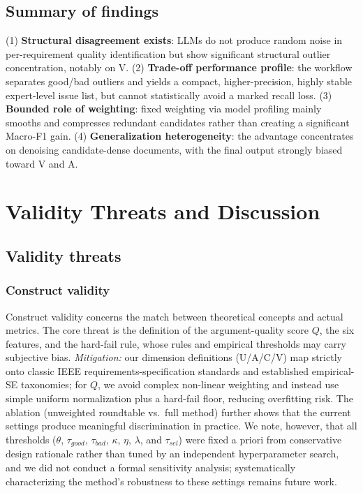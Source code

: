 \documentclass[sn-mathphys-num]{sn-jnl}
\begin{document}
\subsection{Summary of findings}
(1) \textbf{Structural disagreement exists}: LLMs do not produce random noise in per-requirement quality identification but show significant structural outlier concentration, notably on V. (2) \textbf{Trade-off performance profile}: the workflow separates good/bad outliers and yields a compact, higher-precision, highly stable expert-level issue list, but cannot statistically avoid a marked recall loss. (3) \textbf{Bounded role of weighting}: fixed weighting via model profiling mainly smooths and compresses redundant candidates rather than creating a significant Macro-F1 gain. (4) \textbf{Generalization heterogeneity}: the advantage concentrates on denoising candidate-dense documents, with the final output strongly biased toward V and A.

\section{Validity Threats and Discussion}\label{sec:validity}
\subsection{Validity threats}
\subsubsection{Construct validity}
Construct validity concerns the match between theoretical concepts and actual metrics. The core threat is the definition of the argument-quality score $Q$, the six features, and the hard-fail rule, whose rules and empirical thresholds may carry subjective bias. \textit{Mitigation:} our dimension definitions (U/A/C/V) map strictly onto classic IEEE requirements-specification standards and established empirical-SE taxonomies; for $Q$, we avoid complex non-linear weighting and instead use simple uniform normalization plus a hard-fail floor, reducing overfitting risk. The ablation (unweighted roundtable vs.\ full method) further shows that the current settings produce meaningful discrimination in practice. We note, however, that all thresholds ($\theta$, $\tau_{good}$, $\tau_{bad}$, $\kappa$, $\eta$, $\lambda$, and $\tau_{sel}$) were fixed a priori from conservative design rationale rather than tuned by an independent hyperparameter search, and we did not conduct a formal sensitivity analysis; systematically characterizing the method's robustness to these settings remains future work.
\end{document}
